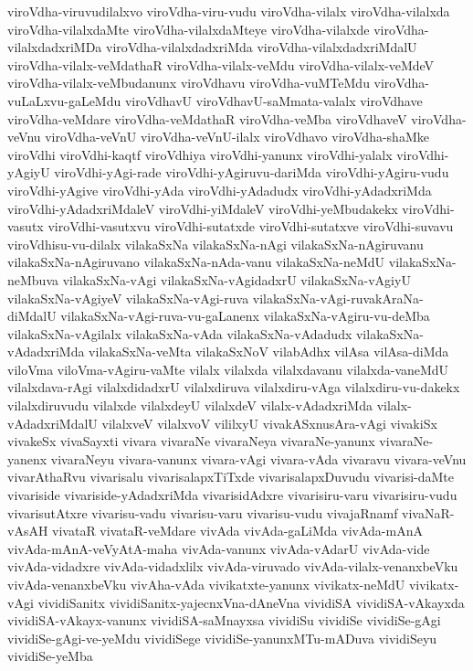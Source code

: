 {viroVdha-viruvudilalxvo
viroVdha-viru-vudu
viroVdha-vilalx
viroVdha-vilalxda
viroVdha-vilalxdaMte
viroVdha-vilalxdaMteye
viroVdha-vilalxde
viroVdha-vilalxdadxriMDa
viroVdha-vilalxdadxriMda
viroVdha-vilalxdadxriMdalU
viroVdha-vilalx-veMdathaR
viroVdha-vilalx-veMdu
viroVdha-vilalx-veMdeV
viroVdha-vilalx-veMbudanunx
viroVdhavu
viroVdha-vuMTeMdu
viroVdha-vuLaLxvu-gaLeMdu
viroVdhavU
viroVdhavU-saMmata-valalx
viroVdhave
viroVdha-veMdare
viroVdha-veMdathaR
viroVdha-veMba
viroVdhaveV
viroVdha-veVnu
viroVdha-veVnU
viroVdha-veVnU-ilalx
viroVdhavo
viroVdha-shaMke
viroVdhi
viroVdhi-kaqtf
viroVdhiya
viroVdhi-yanunx
viroVdhi-yalalx
viroVdhi-yAgiyU
viroVdhi-yAgi-rade
viroVdhi-yAgiruvu-dariMda
viroVdhi-yAgiru-vudu
viroVdhi-yAgive
viroVdhi-yAda
viroVdhi-yAdadudx
viroVdhi-yAdadxriMda
viroVdhi-yAdadxriMdaleV
viroVdhi-yiMdaleV
viroVdhi-yeMbudakekx
viroVdhi-vasutx
viroVdhi-vasutxvu
viroVdhi-sutatxde
viroVdhi-sutatxve
viroVdhi-suvavu
viroVdhisu-vu-dilalx
vilakaSxNa
vilakaSxNa-nAgi
vilakaSxNa-nAgiruvanu
vilakaSxNa-nAgiruvano
vilakaSxNa-nAda-vanu
vilakaSxNa-neMdU
vilakaSxNa-neMbuva
vilakaSxNa-vAgi
vilakaSxNa-vAgidadxrU
vilakaSxNa-vAgiyU
vilakaSxNa-vAgiyeV
vilakaSxNa-vAgi-ruva
vilakaSxNa-vAgi-ruvakAraNa-diMdalU
vilakaSxNa-vAgi-ruva-vu-gaLanenx
vilakaSxNa-vAgiru-vu-deMba
vilakaSxNa-vAgilalx
vilakaSxNa-vAda
vilakaSxNa-vAdadudx
vilakaSxNa-vAdadxriMda
vilakaSxNa-veMta
vilakaSxNoV
vilabAdhx
vilAsa
vilAsa-diMda
viloVma
viloVma-vAgiru-vaMte
vilalx
vilalxda
vilalxdavanu
vilalxda-vaneMdU
vilalxdava-rAgi
vilalxdidadxrU
vilalxdiruva
vilalxdiru-vAga
vilalxdiru-vu-dakekx
vilalxdiruvudu
vilalxde
vilalxdeyU
vilalxdeV
vilalx-vAdadxriMda
vilalx-vAdadxriMdalU
vilalxveV
vilalxvoV
vililxyU
vivakASxnusAra-vAgi
vivakiSx
vivakeSx
vivaSayxti
vivara
vivaraNe
vivaraNeya
vivaraNe-yanunx
vivaraNe-yanenx
vivaraNeyu
vivara-vanunx
vivara-vAgi
vivara-vAda
vivaravu
vivara-veVnu
vivarAthaRvu
vivarisalu
vivarisalapxTiTxde
vivarisalapxDuvudu
vivarisi-daMte
vivariside
vivariside-yAdadxriMda
vivarisidAdxre
vivarisiru-varu
vivarisiru-vudu
vivarisutAtxre
vivarisu-vadu
vivarisu-varu
vivarisu-vudu
vivajaRnamf
vivaNaR-vAsAH
vivataR
vivataR-veMdare
vivAda
vivAda-gaLiMda
vivAda-mAnA
vivAda-mAnA-veVyAtA-maha
vivAda-vanunx
vivAda-vAdarU
vivAda-vide
vivAda-vidadxre
vivAda-vidadxlilx
vivAda-viruvado
vivAda-vilalx-venanxbeVku
vivAda-venanxbeVku
vivAha-vAda
vivikatxte-yanunx
vivikatx-neMdU
vivikatx-vAgi
vividiSanitx
vividiSanitx-yajecnxVna-dAneVna
vividiSA
vividiSA-vAkayxda
vividiSA-vAkayx-vanunx
vividiSA-saMnayxsa
vividiSu
vividiSe
vividiSe-gAgi
vividiSe-gAgi-ve-yeMdu
vividiSege
vividiSe-yanunxMTu-mADuva
vividiSeyu
vividiSe-yeMba
}
